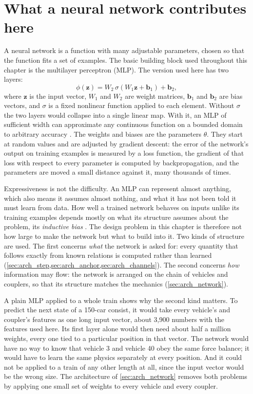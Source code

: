 \section{What a neural network contributes here}
\label{sec:arch_nn_primer}

A neural network is a function with many adjustable parameters, chosen so that the function fits a set of examples. The basic building block used throughout this chapter is the multilayer perceptron (MLP). The version used here has two layers:
\begin{equation}
    \phi(\mathbf{z}) = W_2\,\sigma\!\left(W_1 \mathbf{z} + \mathbf{b}_1\right) + \mathbf{b}_2 ,
    \label{eq:arch_mlp}
\end{equation}
where $\mathbf{z}$ is the input vector, $W_1$ and $W_2$ are weight matrices, $\mathbf{b}_1$ and $\mathbf{b}_2$ are bias vectors, and $\sigma$ is a fixed nonlinear function applied to each element. Without $\sigma$ the two layers would collapse into a single linear map. With it, an MLP of sufficient width can approximate any continuous function on a bounded domain to arbitrary accuracy \cite{hornik1989universal}. The weights and biases are the parameters $\theta$. They start at random values and are adjusted by gradient descent: the error of the network's output on training examples is measured by a loss function, the gradient of that loss with respect to every parameter is computed by backpropagation, and the parameters are moved a small distance against it, many thousands of times.

Expressiveness is not the difficulty. An MLP can represent almost anything, which also means it assumes almost nothing, and what it has not been told it must learn from data. How well a trained network behaves on inputs unlike its training examples depends mostly on what its structure assumes about the problem, its \emph{inductive bias} \cite{battaglia2018relational}. The design problem in this chapter is therefore not how large to make the network but what to build into it. Two kinds of structure are used. The first concerns \emph{what} the network is asked for: every quantity that follows exactly from known relations is computed rather than learned (\cref{sec:arch_step,sec:arch_anchor,sec:arch_channels}). The second concerns \emph{how} information may flow: the network is arranged on the chain of vehicles and couplers, so that its structure matches the mechanics (\cref{sec:arch_network}).

A plain MLP applied to a whole train shows why the second kind matters. To predict the next state of a 150-car consist, it would take every vehicle's and coupler's features as one long input vector, about 3,900 numbers with the features used here. Its first layer alone would then need about half a million weights, every one tied to a particular position in that vector. The network would have no way to know that vehicle 3 and vehicle 40 obey the same force balance; it would have to learn the same physics separately at every position. And it could not be applied to a train of any other length at all, since the input vector would be the wrong size. The architecture of \cref{sec:arch_network} removes both problems by applying one small set of weights to every vehicle and every coupler.

